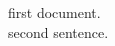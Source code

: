 \documentclass{article}
\begin{document}
    first document.\\   %
    second sentence.
\end{document}
